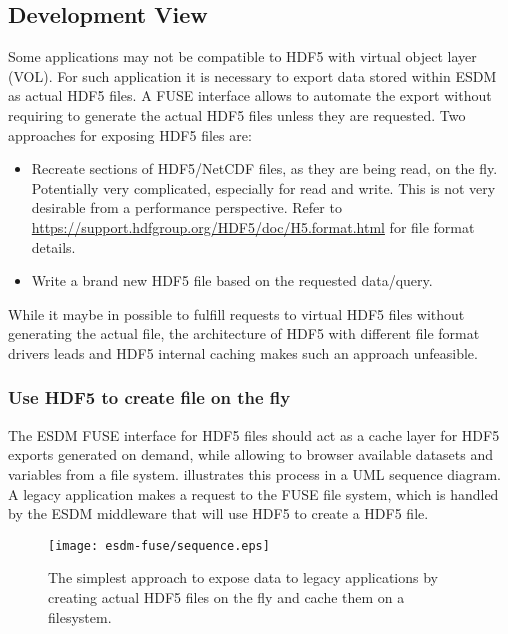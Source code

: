 \subsection{Development View}
\label{sec: fuse/development}

%


Some applications may not be compatible to HDF5 with virtual object layer (VOL).
For such application it is necessary to export data stored within ESDM as actual HDF5 files.
A FUSE interface allows to automate the export without requiring to generate the actual HDF5 files unless they are requested.
Two approaches for exposing HDF5 files are:

\begin{itemize}
	\item Recreate sections of HDF5/NetCDF files, as they are being read, on the fly. Potentially very complicated, especially for read and write. This is not very desirable from a performance perspective. Refer to \url{https://support.hdfgroup.org/HDF5/doc/H5.format.html} for file format details.
	\item Write a brand new HDF5 file based on the requested data/query.
\end{itemize}

While it maybe in possible to fulfill requests to virtual HDF5 files without generating the actual file, the architecture of HDF5 with different file format drivers leads and HDF5 internal caching makes such an approach unfeasible.


\subsubsection{Use HDF5 to create file on the fly}

The ESDM FUSE interface for HDF5 files should act as a cache layer for HDF5 exports generated on demand, while allowing
to browser available datasets and variables from a file system.
 illustrates this process in a UML sequence diagram.
A legacy application makes a request to the FUSE file system, which is handled by the ESDM middleware that will use HDF5 to create a HDF5 file.


\begin{figure}
	\centering
	\texttt{[image: esdm-fuse/sequence.eps]}
	\caption{The simplest approach to expose data to legacy applications by creating actual HDF5 files on the fly and cache them on a filesystem.}
	\label{fig:fuse hdf5 sequence}
\end{figure}



